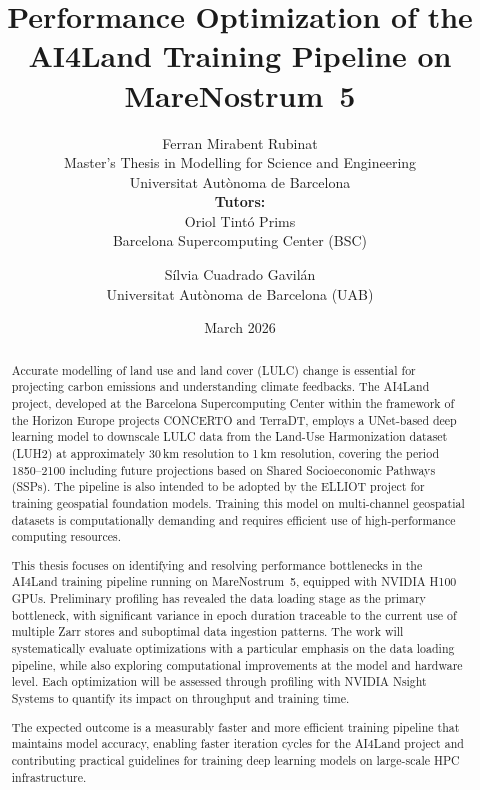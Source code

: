 \documentclass[12pt,a4paper]{article}
\title{\textbf{Performance Optimization of the AI4Land Training Pipeline on MareNostrum~5}}
\author{
  Ferran Mirabent Rubinat\\[1em]
  \small Master's Thesis in Modelling for Science and Engineering\\
  \small Universitat Aut\`onoma de Barcelona\\[1.5em]
  \small \textbf{Tutors:}\\
  \small Oriol Tint\'o Prims \\
  \small Barcelona Supercomputing Center (BSC)\\\and
  \small S\'ilvia Cuadrado Gavil\'an\\[0.5em]
  \small Universitat Aut\`onoma de Barcelona (UAB)
}
\date{March 2026}
\begin{document}
\maketitle
\thispagestyle{empty}

\begin{abstract}
Accurate modelling of land use and land cover (LULC) change is essential for projecting carbon
emissions and understanding climate feedbacks. The AI4Land project, developed at the Barcelona
Supercomputing Center within the framework of the Horizon Europe projects CONCERTO and TerraDT,
employs a UNet-based deep learning model to downscale LULC data from the Land-Use Harmonization
dataset (LUH2) at approximately 30\,km resolution to 1\,km resolution, covering the period
1850--2100 including future projections based on Shared Socioeconomic Pathways (SSPs). The
pipeline is also intended to be adopted by the ELLIOT project for training geospatial foundation
models. Training this model on multi-channel geospatial datasets is computationally demanding
and requires efficient use of high-performance computing resources.

This thesis focuses on identifying and resolving performance bottlenecks in the AI4Land training
pipeline running on MareNostrum~5, equipped with NVIDIA H100 GPUs. Preliminary profiling has
revealed the data loading stage as the primary bottleneck, with significant variance in epoch
duration traceable to the current use of multiple Zarr stores and suboptimal data ingestion
patterns. The work will systematically evaluate optimizations with a particular emphasis on the
data loading pipeline, while also exploring computational improvements at the model and hardware
level. Each optimization will be assessed through profiling with NVIDIA Nsight Systems to quantify
its impact on throughput and training time.

The expected outcome is a measurably faster and more efficient training pipeline that maintains
model accuracy, enabling faster iteration cycles for the AI4Land project and contributing
practical guidelines for training deep learning models on large-scale HPC infrastructure.
\end{abstract}
\end{document}
